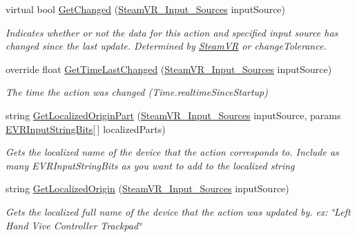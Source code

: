 \begin{DoxyCompactItemize}
virtual bool \mbox{\hyperlink{class_valve_1_1_v_r_1_1_steam_v_r___action___in_ab5dff6e847415ea70581fb544443738d}{Get\+Changed}} (\mbox{\hyperlink{namespace_valve_1_1_v_r_a82e5bf501cc3aa155444ee3f0662853f}{Steam\+V\+R\+\_\+\+Input\+\_\+\+Sources}} input\+Source)
\begin{DoxyCompactList}\small\item\em Indicates whether or not the data for this action and specified input source has changed since the last update. Determined by \mbox{\hyperlink{class_valve_1_1_v_r_1_1_steam_v_r}{Steam\+VR}} or \textquotesingle{}change\+Tolerance\textquotesingle{}. \end{DoxyCompactList}\item 
override float \mbox{\hyperlink{class_valve_1_1_v_r_1_1_steam_v_r___action___in_accdc869f6fd50ef15580a271b6de4d30}{Get\+Time\+Last\+Changed}} (\mbox{\hyperlink{namespace_valve_1_1_v_r_a82e5bf501cc3aa155444ee3f0662853f}{Steam\+V\+R\+\_\+\+Input\+\_\+\+Sources}} input\+Source)
\begin{DoxyCompactList}\small\item\em The time the action was changed (Time.\+realtime\+Since\+Startup) \end{DoxyCompactList}\item 
string \mbox{\hyperlink{class_valve_1_1_v_r_1_1_steam_v_r___action___in_a6ae3b2c4b90917042b1fda3fe54b2d36}{Get\+Localized\+Origin\+Part}} (\mbox{\hyperlink{namespace_valve_1_1_v_r_a82e5bf501cc3aa155444ee3f0662853f}{Steam\+V\+R\+\_\+\+Input\+\_\+\+Sources}} input\+Source, params \mbox{\hyperlink{namespace_valve_1_1_v_r_a05e76187bbc5846b9bfb44f6acf13912}{E\+V\+R\+Input\+String\+Bits}}\mbox{[}$\,$\mbox{]} localized\+Parts)
\begin{DoxyCompactList}\small\item\em Gets the localized name of the device that the action corresponds to. Include as many E\+V\+R\+Input\+String\+Bits as you want to add to the localized string \end{DoxyCompactList}\item 
string \mbox{\hyperlink{class_valve_1_1_v_r_1_1_steam_v_r___action___in_a330a9cf6a0b63e08804318d49e43509e}{Get\+Localized\+Origin}} (\mbox{\hyperlink{namespace_valve_1_1_v_r_a82e5bf501cc3aa155444ee3f0662853f}{Steam\+V\+R\+\_\+\+Input\+\_\+\+Sources}} input\+Source)
\begin{DoxyCompactList}\small\item\em Gets the localized full name of the device that the action was updated by. ex\+: \char`\"{}\+Left Hand Vive Controller Trackpad\char`\"{} \end{DoxyCompactList}\item 

\end{DoxyCompactItemize}
